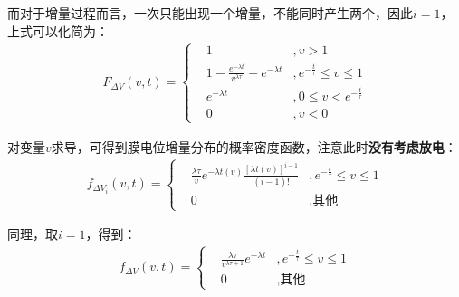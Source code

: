 \documentclass[11pt]{article}
\begin{document}
而对于增量过程而言，一次只能出现一个增量，不能同时产生两个，因此$i=1$，上式可以化简为：
\begin{align}
  F_{\Delta V}(v,t) =\left\{\begin{aligned}
                               & 1                                                                     & ,v>1                              \\
                               & \displaystyle 1-\frac{e^{-\lambda t}}{v^{\lambda\tau}}+e^{-\lambda t} & , e^{-\frac{t}{\tau}} \le v \le 1 \\
                               & e^{-\lambda t}                                                        & ,0\le v<e^{-\frac{t}{\tau}}       \\
                               & 0                                                                     & ,v<0
                            \end{aligned}\right.\label{eq:膜电位增量的分布}
\end{align}\par
对变量$v$求导，可得到膜电位增量分布的概率密度函数，注意此时\textbf{没有考虑放电}：
\begin{align}
  f_{\Delta V_i}(v,t)=\left\{
  \begin{aligned}
     & \displaystyle\frac{\lambda\tau}{v}e^{-\lambda t(v)}\frac{[\lambda t(v)]^{i-1}}{(i-1)!} & ,e^{-\frac{t}{\tau}} \le v \le 1 \\
     & 0                                                                                      & ,\textrm{其他}
  \end{aligned}
  \right.
\end{align}\par
同理，取$i=1$，得到：
\begin{align}
  f_{\Delta V}(v,t)=\left\{
  \begin{aligned}
     & \frac{\lambda\tau}{v^{\lambda \tau+1}}e^{-\lambda t} & ,e^{-\frac{t}{\tau}} \le v \le 1 \\
     & 0                                                    & ,\textrm{其他}
  \end{aligned}
  \right.\label{eq:膜电位增量的概率密度函数}
\end{align}\par
\end{document}
